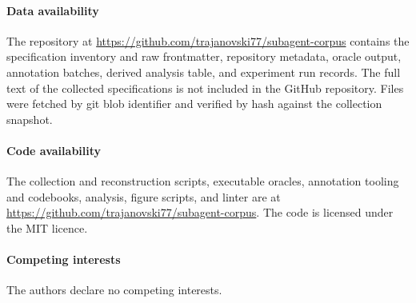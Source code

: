 \documentclass[smallextended,natbib]{svjour3}
\newcommand{\repourl}{https://github.com/trajanovski77/subagent-corpus}
\begin{document}










\paragraph{Data availability}
The repository at \url{\repourl} contains the specification inventory and raw frontmatter,
repository metadata, oracle output, annotation batches, derived analysis table, and experiment run
records. The full text of the collected specifications is not included in the GitHub repository.
Files were fetched by git blob identifier and verified by hash against the collection snapshot.

\paragraph{Code availability}
The collection and reconstruction scripts, executable oracles, annotation tooling and codebooks,
analysis, figure scripts, and linter are at \url{\repourl}. The code is licensed under the MIT licence.

\paragraph{Competing interests}
The authors declare no competing interests.



\end{document}
